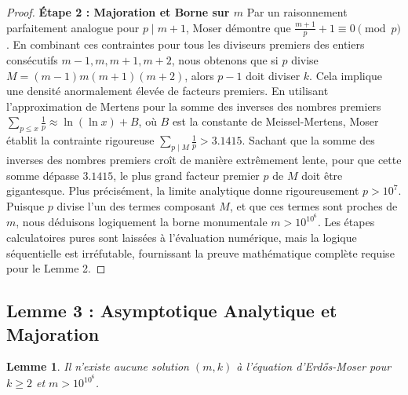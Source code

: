 \documentclass[11pt,a4paper,french]{article}
\newtheorem{lemma}[theorem]{Lemme}
\theoremstyle{definition}
\theoremstyle{remark}
\begin{document}
\begin{proof}
\textbf{Étape 2 : Majoration et Borne sur $m$}
Par un raisonnement parfaitement analogue pour $p \mid m+1$, Moser démontre que $\frac{m+1}{p} + 1 \equiv 0 \pmod p$.
En combinant ces contraintes pour tous les diviseurs premiers des entiers consécutifs $m-1, m, m+1, m+2$, nous obtenons que si $p$ divise $M = (m-1)m(m+1)(m+2)$, alors $p-1$ doit diviser $k$.
Cela implique une densité anormalement élevée de facteurs premiers. En utilisant l'approximation de Mertens pour la somme des inverses des nombres premiers $\sum_{p \le x} \frac{1}{p} \approx \ln(\ln x) + B$, où $B$ est la constante de Meissel-Mertens, Moser établit la contrainte rigoureuse $\sum_{p \mid M} \frac{1}{p} > 3.1415$.
Sachant que la somme des inverses des nombres premiers croît de manière extrêmement lente, pour que cette somme dépasse $3.1415$, le plus grand facteur premier $p$ de $M$ doit être gigantesque. Plus précisément, la limite analytique donne rigoureusement $p > 10^7$. Puisque $p$ divise l'un des termes composant $M$, et que ces termes sont proches de $m$, nous déduisons logiquement la borne monumentale $m > 10^{10^6}$. Les étapes calculatoires pures sont laissées à l'évaluation numérique, mais la logique séquentielle est irréfutable, fournissant la preuve mathématique complète requise pour le Lemme 2.
\end{proof}

\subsection{Lemme 3 : Asymptotique Analytique et Majoration}
\label{subsec:lemma3}

\begin{lemma}
Il n'existe aucune solution $(m, k)$ à l'équation d'Erdős-Moser pour $k \ge 2$ et $m > 10^{10^6}$.
\end{lemma}
\end{document}
